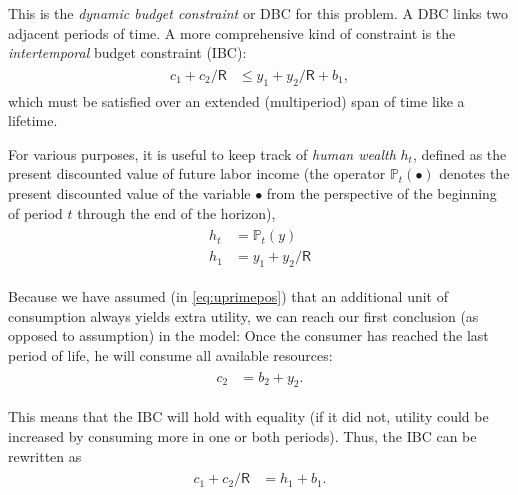 \documentclass{scrartcl}
\begin{document}
  This is the \textit{dynamic budget constraint} or DBC for this problem.  A DBC links two adjacent periods of time.  A more comprehensive kind of constraint is the \textit{intertemporal} budget constraint (IBC):
  \begin{equation}\begin{gathered}\begin{aligned} \boldsymbol{\mathit{c}}_{1}+\boldsymbol{\mathit{c}}_{2}/\mathsf{R} & \leq \boldsymbol{\mathit{y}}_{1}+\boldsymbol{\mathit{y}}_{2}/\mathsf{R}+\boldsymbol{\mathit{b}}_{1} \label{eq:ibcineq},
      \end{aligned}\end{gathered}\end{equation} which must be satisfied over an extended (multiperiod) span of time like a lifetime.

  For various purposes, it is useful to keep track of \textit{human wealth} $\boldsymbol{\mathit{h}}_{t}$, defined as the present discounted value of future labor income (the operator ${\mathbb{P}}_{t}(\bullet)$ denotes the present discounted value of the variable $\bullet$ from the perspective of the beginning of period $t$ through the end of the horizon),
  \begin{equation}\begin{gathered}\begin{aligned} \boldsymbol{\mathit{h}}_{t} & = {\mathbb{P}}_{t}(y) \label{eq:humw} \\ \boldsymbol{\mathit{h}}_{1} & = \boldsymbol{\mathit{y}}_{1}+\boldsymbol{\mathit{y}}_{2}/\mathsf{R}
      \end{aligned}\end{gathered}\end{equation}

  Because we have assumed (in \eqref{eq:uprimepos}) that an additional unit of consumption always yields extra utility, we can reach our first conclusion (as opposed to assumption) in the model: Once the consumer has reached the last period of life, he will consume all available resources:
  \begin{equation}\begin{gathered}\begin{aligned} \boldsymbol{\mathit{c}}_{2} & = \boldsymbol{\mathit{b}}_{2}+\boldsymbol{\mathit{y}}_{2}.
      \end{aligned}\end{gathered}\end{equation}

  This means that the IBC will hold with equality (if it did not, utility could be increased by consuming more in one or both periods).  Thus, the IBC can be rewritten as
  \begin{equation}\begin{gathered}\begin{aligned} \boldsymbol{\mathit{c}}_{1}+\boldsymbol{\mathit{c}}_{2}/\mathsf{R} & = \boldsymbol{\mathit{h}}_{1}+\boldsymbol{\mathit{b}}_{1} \label{eq:ibc}.
      \end{aligned}\end{gathered}\end{equation}
\end{document}
